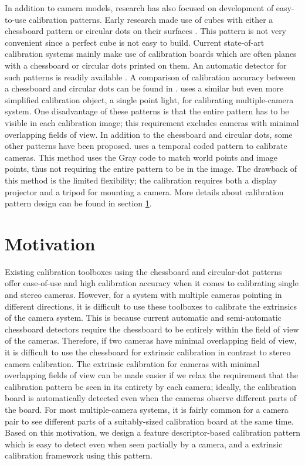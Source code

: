 \documentclass{report}
\begin{document}
In addition to camera models, research has also focused on development of easy-to-use calibration patterns. Early research made use of cubes with either a chessboard pattern or circular dots on their surfaces \cite{bouguet2004camera}. This pattern is not very convenient since a perfect cube is not easy to build. Current state-of-art calibration systems mainly make use of calibration boards which are often planes with a chessboard or circular dots printed on them. An automatic detector for such patterns is readily available \cite{rufli2008automatic}. A comparison of calibration accuracy between a chessboard and circular dots can be found in \cite{mallon2007pattern}. \cite{easycal} uses a similar but even more simplified calibration object, a single point light, for calibrating multiple-camera system. One disadvantage of these patterns is that the entire pattern has to be visible in each calibration image; this requirement excludes cameras with minimal overlapping fields of view. In addition to the chessboard and circular dots, some other patterns have been proposed. \cite{schmalz2011camera} uses a temporal coded pattern to calibrate cameras. This method uses the Gray code to match world points and image points, thus not requiring the entire pattern to be in the image. The drawback of this method is the limited flexibility; the calibration requires both a display projector and a tripod for mounting a camera. More details about calibration pattern design can be found in section \ref{}. 

\section{Motivation}
Existing calibration toolboxes using the chessboard and circular-dot patterns offer ease-of-use and high calibration accuracy when it comes to calibrating single and stereo cameras. However, for a system with multiple cameras pointing in different directions, it is difficult to use these toolboxes to calibrate the extrinsics of the camera system. This is because current automatic and semi-automatic chessboard detectors require the chessboard to be entirely within the field of view of the cameras. Therefore, if two cameras have minimal overlapping field of view, it is difficult to use the chessboard for extrinsic calibration in contrast to stereo camera calibration. The extrinsic calibration for cameras with minimal overlapping fields of view can be made easier if we relax the requirement that the calibration pattern be seen in its entirety by each camera; ideally, the calibration board is automatically detected even when the cameras observe different parts of the board. For most multiple-camera systems, it is fairly common for a camera pair to see different parts of a suitably-sized calibration board at the same time. Based on this motivation, we design a feature descriptor-based calibration pattern which is easy to detect even when seen partially by a camera, and a extrinsic calibration framework using this pattern. 
\end{document}

